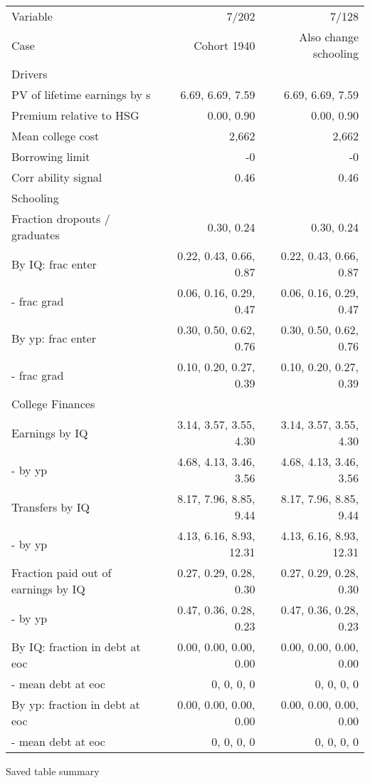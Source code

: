 \begin{tabular}{lrr}
\hline
Variable & 7/202  & 7/128  \\
Case & Cohort 1940  & Also change schooling  \\
Drivers &   &   \\
PV of lifetime earnings by s & 6.69, 6.69, 7.59  & 6.69, 6.69, 7.59  \\
Premium relative to HSG & 0.00, 0.90  & 0.00, 0.90  \\
Mean college cost & 2,662  & 2,662  \\
Borrowing limit & -0  & -0  \\
Corr ability signal & 0.46  & 0.46  \\
\hline
Schooling &   &   \\
Fraction dropouts / graduates & 0.30, 0.24  & 0.30, 0.24  \\
By IQ: frac enter & 0.22, 0.43, 0.66, 0.87  & 0.22, 0.43, 0.66, 0.87  \\
- frac grad & 0.06, 0.16, 0.29, 0.47  & 0.06, 0.16, 0.29, 0.47  \\
By yp: frac enter & 0.30, 0.50, 0.62, 0.76  & 0.30, 0.50, 0.62, 0.76  \\
- frac grad & 0.10, 0.20, 0.27, 0.39  & 0.10, 0.20, 0.27, 0.39  \\
\hline
College Finances &   &   \\
Earnings by IQ & 3.14, 3.57, 3.55, 4.30  & 3.14, 3.57, 3.55, 4.30  \\
- by yp & 4.68, 4.13, 3.46, 3.56  & 4.68, 4.13, 3.46, 3.56  \\
Transfers by IQ & 8.17, 7.96, 8.85, 9.44  & 8.17, 7.96, 8.85, 9.44  \\
- by yp & 4.13, 6.16, 8.93, 12.31  & 4.13, 6.16, 8.93, 12.31  \\
Fraction paid out of earnings by IQ & 0.27, 0.29, 0.28, 0.30  & 0.27, 0.29, 0.28, 0.30  \\
- by yp & 0.47, 0.36, 0.28, 0.23  & 0.47, 0.36, 0.28, 0.23  \\
By IQ: fraction in debt at eoc & 0.00, 0.00, 0.00, 0.00  & 0.00, 0.00, 0.00, 0.00  \\
- mean debt at eoc & 0, 0, 0, 0  & 0, 0, 0, 0  \\
By yp: fraction in debt at eoc & 0.00, 0.00, 0.00, 0.00  & 0.00, 0.00, 0.00, 0.00  \\
- mean debt at eoc & 0, 0, 0, 0  & 0, 0, 0, 0  \\
\hline
\end{tabular}%
Saved table summary

